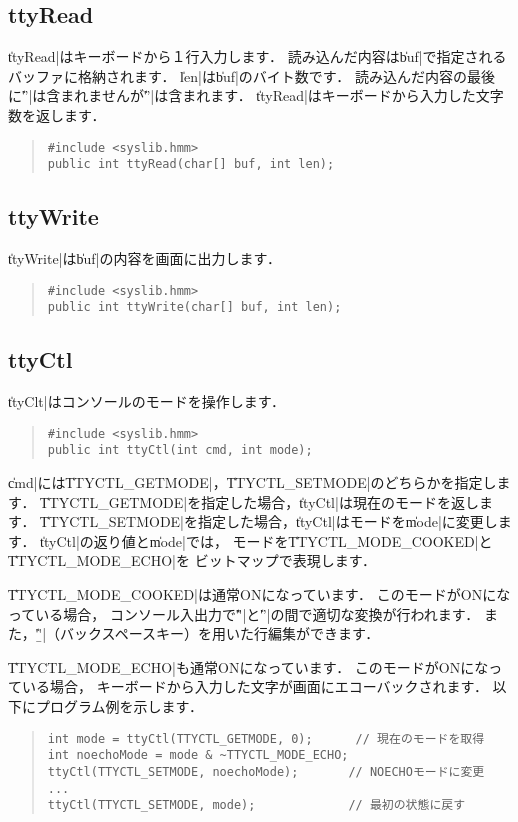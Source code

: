 \subsection{ttyRead}

\|ttyRead|はキーボードから１行入力します．
読み込んだ内容は\|buf|で指定されるバッファに格納されます．
\|len|は\|buf|のバイト数です．
読み込んだ内容の最後に\|'\0'|は含まれませんが\|'\n'|は含まれます．
\|ttyRead|はキーボードから入力した文字数を返します．

\begin{quote}
\begin{verbatim}
#include <syslib.hmm>
public int ttyRead(char[] buf, int len);
\end{verbatim}
\end{quote}

\subsection{ttyWrite}

\|ttyWrite|は\|buf|の内容を画面に出力します．

\begin{quote}
\begin{verbatim}
#include <syslib.hmm>
public int ttyWrite(char[] buf, int len);
\end{verbatim}
\end{quote}

\subsection{ttyCtl}

\|ttyClt|はコンソールのモードを操作します．

\begin{quote}
\begin{verbatim}
#include <syslib.hmm>
public int ttyCtl(int cmd, int mode);
\end{verbatim}
\end{quote}

\|cmd|には\|TTYCTL_GETMODE|，\|TTYCTL_SETMODE|のどちらかを指定します．
\|TTYCTL_GETMODE|を指定した場合，\|ttyCtl|は現在のモードを返します．
\|TTYCTL_SETMODE|を指定した場合，\|ttyCtl|はモードを\|mode|に変更します．
\|ttyCtl|の返り値と\|mode|では，
モードを\|TTYCTL_MODE_COOKED|と\|TTYCTL_MODE_ECHO|を
ビットマップで表現します．

\|TTYCTL_MODE_COOKED|は通常ONになっています．
このモードがONになっている場合，
コンソール入出力で\|'\r'|と\|'\n'|の間で適切な変換が行われます．
また，\|'\b'|（バックスペースキー）を用いた行編集ができます．

\|TTYCTL_MODE_ECHO|も通常ONになっています．
このモードがONになっている場合，
キーボードから入力した文字が画面にエコーバックされます．
以下にプログラム例を示します．

\begin{quote}
\begin{verbatim}
int mode = ttyCtl(TTYCTL_GETMODE, 0);      // 現在のモードを取得
int noechoMode = mode & ~TTYCTL_MODE_ECHO;
ttyCtl(TTYCTL_SETMODE, noechoMode);       // NOECHOモードに変更
...
ttyCtl(TTYCTL_SETMODE, mode);             // 最初の状態に戻す
\end{verbatim}
\end{quote}
